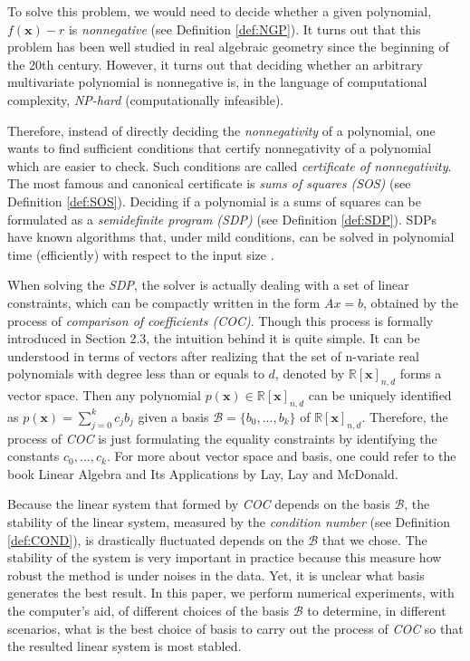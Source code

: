 \documentclass[12pt]{amsart}
\numberwithin{equation}{section}
\theoremstyle{definition}
\numberwithin{thm}{section}
\begin{document}
To solve this problem, we would need to decide whether a given polynomial, $f(\mathbf{x}) - r$ is \emph{nonnegative} (see Definition \ref{def:NGP}).
It turns out that this problem has been well studied in real algebraic geometry since the beginning of the 20th century. 
However, it turns out that deciding whether an arbitrary multivariate polynomial is nonnegative is,
in the language of computational complexity, \emph{NP-hard} (computationally infeasible). 

Therefore, instead of directly deciding the \emph{nonnegativity} of a polynomial, one wants to find sufficient conditions
that certify nonnegativity of a polynomial which are easier to check. Such conditions are called \emph{certificate of nonnegativity}.
The most famous and canonical certificate is \emph{sums of squares (SOS)} (see Definition \ref{def:SOS}).
Deciding if a polynomial is a sums of squares can be formulated as a \emph{semidefinite program (SDP)} (see Definition \ref{def:SDP}).
SDPs have known algorithms that, under mild conditions, can be solved in polynomial time (efficiently) with respect to the input size \cite[Chapter~2]{Blekherman:Parrilo:Thomas}.

When solving the \emph{SDP}, the solver is actually dealing with a set of linear constraints, which can be compactly written in the form $Ax = b$, obtained by the process of \emph{comparison of coefficients (COC)}.
Though this process is formally introduced in Section 2.3, the intuition behind it is quite simple. 
It can be understood in terms of vectors after realizing that the set of n-variate real polynomials with degree less than or equals to $d$, denoted by $\mathbb{R}[\mathbf{x}]_{n, d}$ forms a vector space.
Then any polynomial $p(\mathbf{x}) \in \mathbb{R}[\mathbf{x}]_{n, d}$ can be uniquely identified as $p(\mathbf{x}) = \sum_{j = 0}^k c_j b_j$ given a basis $\mathcal{B} = \{b_0, ..., b_k\}$ of $\mathbb{R}[\mathbf{x}]_{n, d}$.
Therefore, the process of \emph{COC} is just formulating the equality constraints by identifying the constants $c_0, ..., c_k$.
For more about vector space and basis, one could refer to the book Linear Algebra and Its Applications by Lay, Lay and McDonald\cite{strang2006linear}.

Because the linear system that formed by \emph{COC} depends on the basis $\mathcal{B}$,
the stability of the linear system, measured by the \emph{condition number} (see Definition \ref{def:COND}), is drastically fluctuated depends on the $\mathcal{B}$ that we chose. 
The stability of the system is very important in practice because this measure how robust the method is under noises in the data.
Yet, it is unclear what basis generates the best result.
In this paper, we perform numerical experiments, with the computer's aid, of different choices of the basis $\mathcal{B}$ to determine, 
in different scenarios, what is the best choice of basis to carry out the process of \emph{COC} so that the resulted linear system is most stabled. 
\end{document}
